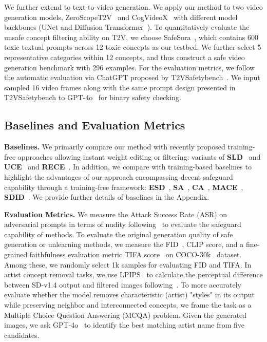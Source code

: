 We further extend \ours{} to text-to-video generation. We apply our method to two video generation models, ZeroScopeT2V~\citep{2023zeroscope} and CogVideoX~\citep{yang2024cogvideox} with different model backbones (UNet and Diffusion Transformer~\citep{peebles2023scalable}). To quantitatively evaluate the unsafe concept filtering ability on T2V, we choose SafeSora~\citep{dai2024safesora}, which contains 600 toxic textual prompts across 12 toxic concepts as our testbed. We further select 5 representative categories within 12 concepts, and thus construct a safe video generation benchmark with 296 examples.
For the evaluation metrics, we follow the automatic evaluation via ChatGPT proposed by T2VSafetybench~\citep{miao2024t2vsafetybench}. 
We input sampled 16 video frames along with the same prompt design presented in T2VSafetybench to GPT-4o~\citep{gpt4o} for binary safety checking.

\subsection{Baselines and Evaluation Metrics}\label{app:exp_baseline}
\textbf{Baselines.} We primarily compare our method with recently proposed training-free approaches allowing instant weight editing or filtering: variants of \textbf{SLD}~\citep{schramowski2023safe} and \textbf{UCE}~\citep{gandikota2024unified} and \textbf{RECE}~\citep{gong2024reliable}. 
In addition, we compare \ours{} with training-based baselines to highlight the advantages of our approach encompassing decent safeguard capability through a training-free framework:
\textbf{ESD}~\citep{gandikota2023erasing}, \textbf{SA}~\citep{heng2023selective}, 
\textbf{CA}~\citep{kumari2023ablating}, \textbf{MACE}~\citep{lu2024mace}, \textbf{SDID}~\citep{li2024self}. We provide further details of baselines in the Appendix.
 
\textbf{Evaluation Metrics.} We measure the Attack Success Rate (ASR) on adversarial prompts in terms of nudity following~\cite{gong2024reliable} to evaluate the safeguard capability of methods. To evaluate the original generation quality of safe generation or unlearning methods, we measure the FID~\citep{heusel2017gans}, CLIP score, and a fine-grained faithfulness evaluation metric TIFA score~\citep{hu2023tifa} on COCO-30k~\citep{lin2014microsoft} dataset. Among these, we randomly select 1k samples for evaluating FID and TIFA. In artist concept removal tasks, we use LPIPS~\citep{zhang2018unreasonable} to calculate the perceptual difference between SD-v1.4 output and filtered images following~\cite{gong2024reliable}. 
To more accurately evaluate whether the model removes characteristic (artist) "styles" in its output while preserving neighbor and interconnected concepts, we frame the task as a Multiple Choice Question Answering (MCQA) problem. Given the generated images, we ask GPT-4o~\citep{gpt4o} to identify the best matching artist name from five candidates.


